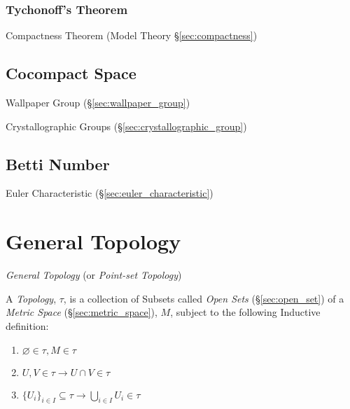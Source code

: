 \subsubsection{Tychonoff's Theorem}\label{sec:tychonoffs_theorem}

Compactness Theorem (Model Theory \S\ref{sec:compactness})



\subsection{Cocompact Space}\label{sec:cocompact_space}

Wallpaper Group (\S\ref{sec:wallpaper_group})

Crystallographic Groups (\S\ref{sec:crystallographic_group})



\subsection{Betti Number}\label{sec:betti_number}

Euler Characteristic (\S\ref{sec:euler_characteristic})



\section{General Topology}\label{sec:general_topology}

\emph{General Topology} (or \emph{Point-set Topology})

A \emph{Topology}, $\tau$, is a collection of Subsets called
\emph{Open Sets} (\S\ref{sec:open_set}) of a \emph{Metric Space}
(\S\ref{sec:metric_space}), $M$, subject to the following Inductive
definition:
\begin{enumerate}
\item $\varnothing \in \tau, M \in \tau$
\item $U,V \in \tau \rightarrow U \cap V \in \tau$
\item $\{U_i\}_{i \in I} \subseteq \tau \rightarrow \bigcup_{i \in I}
  U_i \in \tau$
\end{enumerate}

